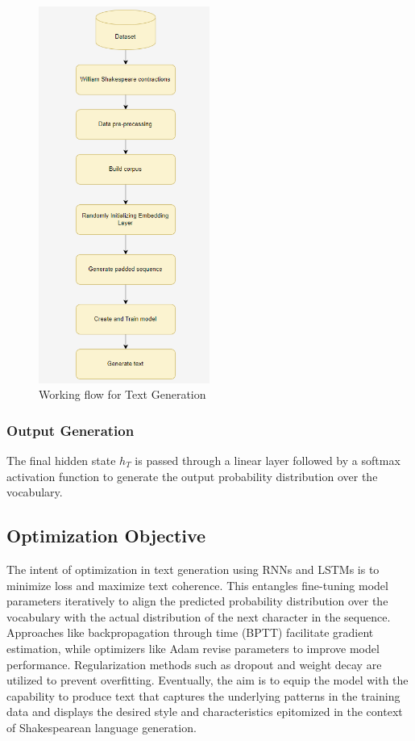 \documentclass[conference]{IEEEtran}
\begin{document}
\begin{figure}
    \centering
    \includegraphics[width=0.5\textwidth]{p4.png}
    \caption{Working flow for Text Generation}
    \label{fig:example}
\end{figure}



\subsubsection{Output Generation}
The final hidden state \( h_T \) is passed through a linear layer followed by a softmax activation function to generate the output probability distribution over the vocabulary.





\subsection{Optimization Objective}

The intent of optimization in text generation using RNNs and LSTMs is to minimize loss and maximize text coherence. This entangles fine-tuning model parameters iteratively to align the predicted probability distribution over the vocabulary with the actual distribution of the next character in the sequence. Approaches like backpropagation through time (BPTT) facilitate gradient estimation, while optimizers like Adam revise parameters to improve model performance. Regularization methods such as dropout and weight decay are utilized to prevent overfitting. Eventually, the aim is to equip the model with the capability to produce text that captures the underlying patterns in the training data and displays the desired style and characteristics epitomized in the context of Shakespearean language generation.
\end{document}
